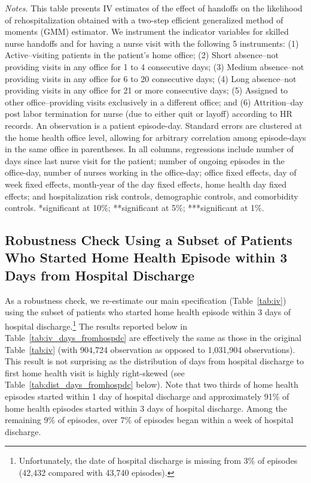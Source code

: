 \documentclass[final,12pt, notitlepage]{article}
\begin{document}
\begin{singlespace}
\begin{table}[H]
\begin{threeparttable}
{}
	\begin{tablenotes}
	\scriptsize
		\item \emph{Notes.} This table presents IV estimates of the effect of handoffs on the likelihood of rehospitalization obtained with a two-step efficient generalized method of moments (GMM) estimator.
	We instrument the indicator variables for skilled nurse handoffs and for having a nurse visit with the following 5 instruments:
(1) Active--visiting patients in the patient's home office;
(2) Short absence--not providing visits in any office for 1 to 4 consecutive days;
(3) Medium absence--not providing visits in any office for 6 to 20 consecutive days;
(4) Long absence--not providing visits in any office for 21 or more consecutive days;
(5) Assigned to other office--providing visits exclusively in a different office; and
(6) Attrition--day post labor termination for nurse (due to either quit or layoff) according to HR records.
	An observation is a patient episode-day.
	Standard errors are clustered at the home health office level, allowing for arbitrary correlation among episode-days in the same office in parentheses.
	In all columns, regressions include number of days since last nurse visit for the patient; number of ongoing episodes in the office-day, number of nurses working in the office-day; office fixed effects, day of week fixed effects, month-year of the day fixed effects, home health day fixed effects; and hospitalization risk controls, demographic controls, and comorbidity controls.
	*significant at 10\%; **significant at 5\%; ***significant at 1\%.

	\end{tablenotes}
\end{threeparttable}
\end{table}


\clearpage
\subsection{Robustness Check Using a Subset of Patients Who Started Home Health Episode within 3 Days from Hospital Discharge} \label{appendix:dist_days_fromhospdc}

As a robustness check, we re-estimate our main specification (Table~\ref{tab:iv}) using the subset of patients who started home health episode within 3 days of hospital discharge.\footnote{Unfortunately, the date of hospital discharge is missing from 3\% of episodes (42,432 compared with 43,740 episodes).} The results reported below in Table~\ref{tab:iv_days_fromhospdc} are effectively the same as those in the original Table~\ref{tab:iv} (with 904,724 observation as opposed to 1,031,904 observations). This result is not surprising as the distribution of days from hospital discharge to first home health visit is highly right-skewed (see Table~\ref{tab:dist_days_fromhospdc} below). Note that two thirds of home health episodes started within 1 day of hospital discharge and approximately 91\% of home health episodes started within 3 days of hospital discharge. Among the remaining 9\% of episodes, over 7\% of episodes began within a week of hospital discharge.




\end{singlespace}
\end{document}
